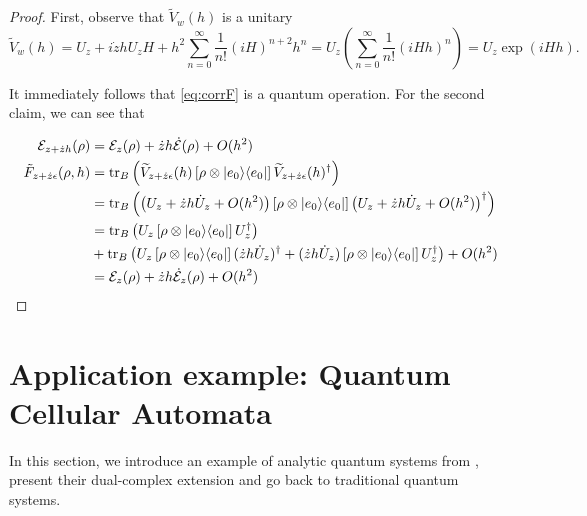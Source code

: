 \documentclass{article}
\newcommand{\e}{\epsilon}
\newcommand{\til}{\widetilde}
\newcommand\ketbra[2]{\ket{#1}\!\bra{#2}}
\begin{document}
\begin{proof}
First, observe that $\til{V}_w(h)$ is a unitary
\begin{equation}
\til{V}_w(h) = U_z + i \dot{z} h U_z H + h^2 \sum_{n=0}^\infty \frac{1}{n!} (iH)^{n+2}h^n = U_z(\sum_{n=0}^\infty \frac{1}{n!} (iHh)^{n}) = U_z \exp(iHh).
\end{equation}

It immediately follows that \ref{eq:corrF} is a quantum operation. For the second claim, we can see that

\begin{equation}
\begin{split}
\end{split}
\begin{align*}
\mathcal{E}_{z+\dot{z}h}(\rho)
&= \mathcal{E}_z(\rho) + \dot{z} h \dot{\mathcal{E}}(\rho) + O(h^2) \\
\tilde{F}_{z+\dot{z}\e}(\rho, h)
&= \operatorname{tr}_B\left(\til{V}_{z+\dot{z}\e}(h) \left[ \rho \otimes \ketbra{e_0}{e_0} \right] \til{V}_{z+\dot{z}\e}(h)^\dagger\right) \\
&= \operatorname{tr}_B\left(\left( U_z + \dot{z} h \dot{U}_z + O(h^2) \right)
\left[ \rho \otimes \ketbra{e_0}{e_0} \right]
\left( U_z + \dot{z} h \dot{U}_z + O(h^2) \right)^\dagger\right)\\
&=\operatorname{tr}_B\left(U_z \left[ \rho \otimes \ketbra{e_0}{e_0} \right] U_z^\dagger\right) \\
&+ \operatorname{tr}_B\left(U_z \left[ \rho \otimes \ketbra{e_0}{e_0} \right] (\dot{z} h \dot{U}_z)^\dagger
+ (\dot{z} h \dot{U}_z) \left[ \rho \otimes \ketbra{e_0}{e_0} \right] U_z^\dagger \right) + O(h^2)\\
&= \mathcal{E}_z(\rho) + \dot{z} h \dot{\mathcal{E}}_z(\rho) + O(h^2)
\end{align*}
\end{equation}
\end{proof}

\section{Application example: Quantum Cellular Automata}


In this section, we introduce an example of analytic quantum systems from \cite{arrighi2020}, present their dual-complex extension and go back to traditional quantum systems.
\end{document}

